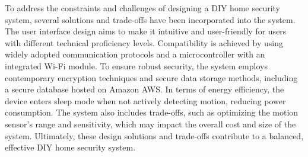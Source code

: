 \documentclass[conference]{IEEEtran}
\begin{document}
To address the constraints and challenges of designing a DIY home security system,
several solutions and trade-offs have been incorporated into the system. The user
interface design aims to make it intuitive and user-friendly for users with different
technical proficiency levels. Compatibility is achieved by using widely adopted
communication protocols and a microcontroller with an integrated Wi-Fi module.
To ensure robust security, the system employs contemporary encryption techniques
and secure data storage methods, including a secure database hosted on Amazon AWS.
In terms of energy efficiency, the device enters sleep mode when not actively
detecting motion, reducing power consumption. The system also includes trade-offs,
such as optimizing the motion sensor's range and sensitivity, which may impact the
overall cost and size of the system. Ultimately, these design solutions and
trade-offs contribute to a balanced, effective DIY home security system.




\end{document}
